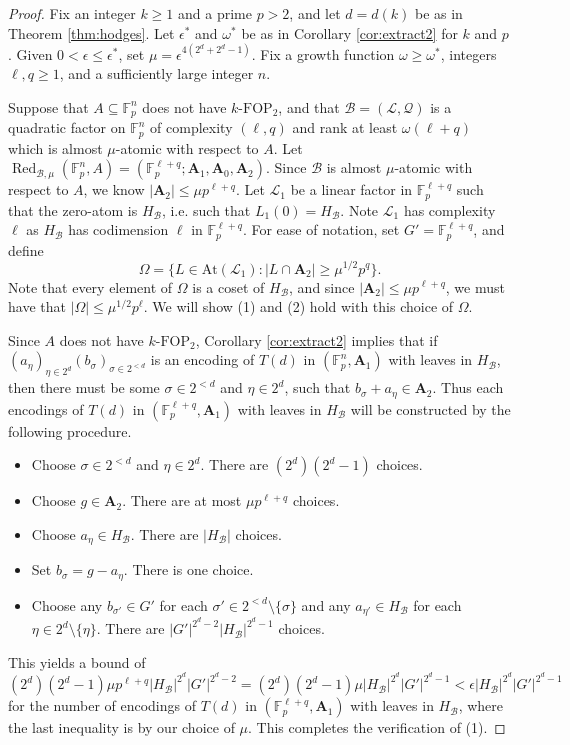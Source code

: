\documentclass[12pt,oneside,british,a4wide]{amsart}
\numberwithin{equation}{section}
\theoremstyle{definition}
\def\F{\mathbb{F}}
\def\FOP{\mathrm{FOP}}
\def\e{\epsilon}
\newcommand{\calL}{\mathcal{L}}
\newcommand{\calB}{\mathcal{B}}
\newcommand{\calQ}{\mathcal{Q}}
\newcommand{\Red}{{\mathrm{Red}}}
\newcommand{\At}{{\mathrm{At}}}
\def\Red{\operatorname{Red}}
\begin{document}
\begin{proof}
Fix an integer $k\geq 1$ and a prime $p>2$, and let $d=d(k)$ be as in Theorem \ref{thm:hodges}.   Let $\e^*$ and $\omega^*$ be as in Corollary \ref{cor:extract2} for $k$ and $p$.  Given $0<\e\leq \e^*$, set $\mu=\e^{4(2^d+2^d-1)}$.  Fix a growth function $\omega\geq \omega^*$, integers  $\ell,q\geq 1$, and a sufficiently large integer $n$. 


Suppose that $A\subseteq \F_p^n$ does not have $k$-$\FOP_2$, and that $\calB=(\calL,\calQ)$ is a quadratic factor on $\F_p^n$ of complexity $(\ell,q)$ and rank at least $\omega(\ell+q)$ which is almost $\mu$-atomic with respect to $A$.  Let  $\Red_{\calB,\mu}(\F_p^n,A)=(\mathbb{F}_p^{\ell+q};\mathbf{A}_1,\mathbf{A}_0,\mathbf{A}_2)$.  Since $\calB$ is almost $\mu$-atomic with respect to $A$, we know $|\mathbf{A}_2|\leq \mu p^{\ell+q}$.   Let $\calL_1$ be a linear factor in $\F_p^{\ell+q}$ such that the zero-atom is $H_{\calB}$, i.e. such that $L_1(0)=H_{\calB}$.  Note $\calL_1$ has complexity $\ell$ as $H_{\calB}$ has codimension $\ell$ in $\F_p^{\ell+q}$.  For ease of notation, set $G'=\F_p^{\ell+q}$, and define 
$$
\Omega=\{L\in \At(\calL_1): |L\cap \mathbf{A}_2|\geq \mu^{1/2}p^{q}\}.
$$
Note that every element of $\Omega$ is a coset of $H_{\calB}$, and since $|\mathbf{A}_2|\leq \mu p^{\ell+q}$, we must have that $|\Omega|\leq \mu^{1/2}p^{\ell}$.  We will show (1) and (2) hold with this choice of $\Omega$.
 

Since $A$ does not have $k$-$\FOP_2$, Corollary \ref{cor:extract2} implies that if $(a_{\eta})_{\eta\in 2^d}(b_{\sigma})_{\sigma\in 2^{<d}}$ is an encoding of $T(d)$ in $(\F_p^n,\mathbf{A}_1)$   with leaves in $H_{\calB}$, then there must be some $\sigma\in 2^{<d}$ and $\eta\in 2^d$, such that $b_{\sigma}+a_{\eta}\in \mathbf{A}_2$.  Thus each encodings of $T(d)$ in $(\F_p^{\ell+q},\mathbf{A}_1)$ with leaves in $H_{\calB}$ will be constructed by the following procedure.
\begin{itemize}
\item Choose $\sigma\in 2^{<d}$ and $\eta\in 2^d$.  There are $(2^d)(2^d-1)$ choices.
\item Choose $g\in \mathbf{A}_2$.  There are at most $\mu p^{\ell+q}$ choices.
\item Choose $a_{\eta}\in H_{\calB}$.  There are $|H_{\calB}|$ choices.
\item Set $b_{\sigma}=g-a_{\eta}$.  There is one choice.
\item Choose any $b_{\sigma'}\in G'$ for each $\sigma'\in 2^{<d}\setminus\{\sigma\}$ and any $a_{\eta'}\in H_{\calB}$ for each $\eta\in 2^d\setminus\{\eta\}$.  There are $|G'|^{2^d-2}|H_{\calB}|^{2^d-1}$ choices.
\end{itemize}
This yields a bound of 
$$
(2^d)(2^d-1)\mu p^{\ell+q}|H_{\calB}|^{2^d}|G'|^{2^d-2}=(2^d)(2^d-1)\mu |H_{\calB}|^{2^d}|G'|^{2^d-1}<\e |H_{\calB}|^{2^d}|G'|^{2^d-1}
$$
for the number of encodings of $T(d)$ in $(\F_p^{\ell+q},\mathbf{A}_1)$ with leaves in  $H_{\calB}$, where the last inequality is by our choice of $\mu$.  This completes the verification of (1).  


\end{proof}
\end{document}
